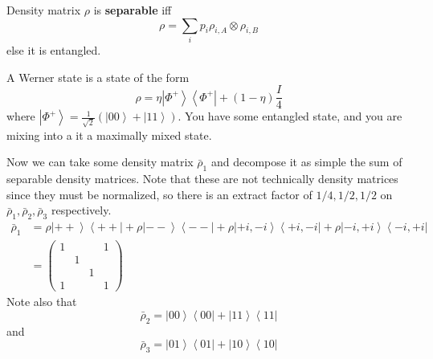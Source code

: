 \documentclass{article}
\newcommand{\ket}[1]{\ensuremath{\left|#1\right\rangle}}
\newcommand{\bra}[1]{\ensuremath{\left\langle#1\right|}}
\begin{document}
  \begin{definition}[Separable]
    Density matrix $\rho$ is \textbf{separable} iff
    \begin{equation}
      \rho = \sum_i p_i \rho_{i, A} \otimes \rho_{i, B}
    \end{equation}
    else it is entangled. 
  \end{definition}

  \begin{definition}
    A Werner state is a state of the form 
    \begin{equation}
      \rho = \eta \ket{\Phi^+}\bra{\Phi^+} + (1-\eta) \frac{I}{4}
    \end{equation}
    where $\ket{\Phi^+} = \frac{1}{\sqrt{2}} (\ket{00} + \ket{11})$. You have some entangled state, and you are mixing into a it a maximally mixed state. 
  \end{definition}

  Now we can take some density matrix $\bar{\rho}_1$ and decompose it as simple the sum of separable density matrices. Note that these are not technically density matrices since they must be normalized, so there is an extract factor of $1/4, 1/2, 1/2$ on $\bar{\rho}_1, \bar{\rho}_2, \bar{\rho}_3$ respectively. 
  \begin{align}
    \bar{\rho}_1 & = \rho \ket{++} \bra{++} + \rho \ket{- -} \bra{--} + \rho \ket{+i, -i} \bra{+i, -i} + \rho \ket{-i, +i} \bra{-i, +i} \\
                 & = \begin{pmatrix} 1 & & & 1 \\ & 1 & & \\ & & 1 & \\ 1 & & & 1 \end{pmatrix} 
  \end{align}
  Note also that 
  \begin{equation}
    \bar{\rho}_2 = \ket{00} \bra{00} + \ket{11} \bra{11} 
  \end{equation}
  and 
  \begin{equation}
    \bar{\rho}_3 = \ket{01}\bra{01} + \ket{10}\bra{10} 
  \end{equation}
\end{document}
